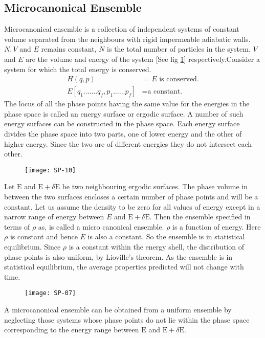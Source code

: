 \subsection{Microcanonical Ensemble}
Microcanonical ensemble is a collection of independent systems of constant volume separated from the neighbours with rigid impermeable adiabatic walls. $N, V$ and $E$ remains constant, $N$ is the total number of particles in the system. $V$ and $E$ are the volume and energy of the system [See fig \ref{SP-02}] respectively.Consider a system for which the total energy is conserved.
\begin{align*}
H(q, p)&=E \text{ is conserved.}\\
E\left[q_{1} \ldots \ldots . q_{f}, p_{1} \ldots \ldots p_{f}\right]&=\text{a constant.}
\end{align*}
The locus of all the phase points having the same value for the energies in the phase space is called an energy surface or ergodic surface. A number of such energy surfaces can be constructed in the phase space. Each energy surface divides the phase space into two parts, one of lower energy and the other of higher energy. Since the two are of different energies they do not intersect each other.
\begin{figure}[H]
	\centering
	\texttt{[image: SP-10]}
		\caption{}
		\label{SP-02}
\end{figure}
Let $\mathrm{E}$ and $\mathrm{E}+\delta \mathrm{E}$ be two neighbouring ergodic surfaces. The phase volume in between the two surfaces encloses a certain number of phase points and will be a constant. Let us assume the density to be zero for all values of energy except in a narrow range of energy between $E$ and $\mathrm{E}+\delta \mathrm{E}$. Then the ensemble specified in terms of $\rho$ as, is called a micro canonical ensemble.
$\rho$ is a function of energy. Here $\rho$ is constant and hence $E$ is also a constant. So the ensemble is in statistical equilibrium. Since $\rho$ is a constant within the energy shell, the distribution of phase points is also uniform, by Lioville's theorem. As the ensemble is in statistical equilibrium, the average properties predicted will not change with time.\\
\begin{figure}[H]
	\centering
	\texttt{[image: SP-07]}
\end{figure}
A microcanonical ensemble can be obtained from a uniform ensemble by neglecting those systems whose phase points do not lie within the phase space corresponding to the energy range between $\mathrm{E}$ and $\mathrm{E}+\delta \mathrm{E}$.
